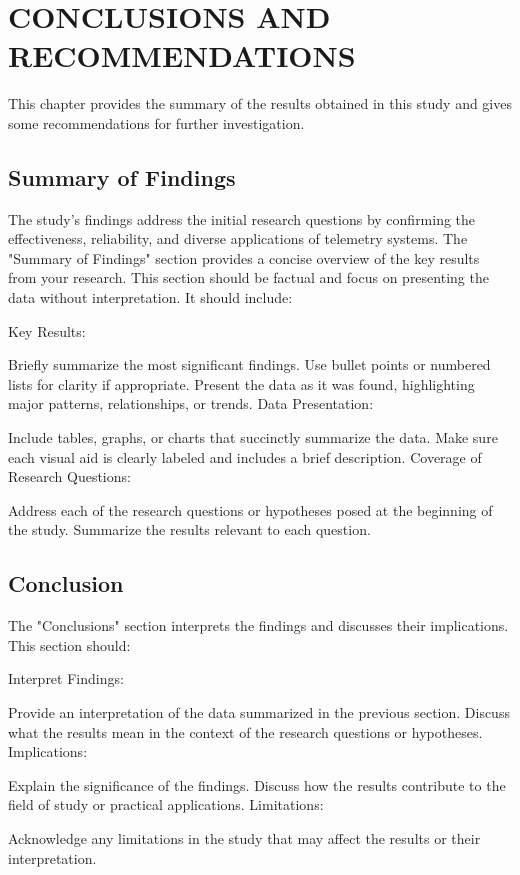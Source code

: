 \chapter{CONCLUSIONS AND RECOMMENDATIONS}
{\baselineskip}

This chapter provides the summary of the results obtained in this study and gives some recommendations for further investigation.

\section{Summary of Findings}

The study’s findings address the initial research questions by confirming the effectiveness, reliability, and diverse applications of telemetry systems.
The "Summary of Findings" section provides a concise overview of the key results from your research. This section should be factual and focus on presenting the data without interpretation. It should include:

Key Results:

Briefly summarize the most significant findings.
Use bullet points or numbered lists for clarity if appropriate.
Present the data as it was found, highlighting major patterns, relationships, or trends.
Data Presentation:

Include tables, graphs, or charts that succinctly summarize the data.
Make sure each visual aid is clearly labeled and includes a brief description.
Coverage of Research Questions:

Address each of the research questions or hypotheses posed at the beginning of the study.
Summarize the results relevant to each question.

\section{Conclusion}
The "Conclusions" section interprets the findings and discusses their implications. This section should:

Interpret Findings:

Provide an interpretation of the data summarized in the previous section.
Discuss what the results mean in the context of the research questions or hypotheses.
Implications:

Explain the significance of the findings.
Discuss how the results contribute to the field of study or practical applications.
Limitations:

Acknowledge any limitations in the study that may affect the results or their interpretation.
\newpage
